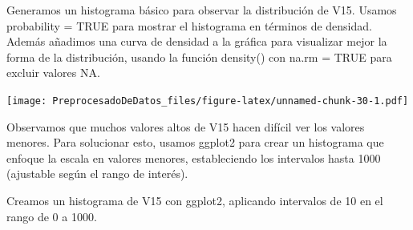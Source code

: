 \documentclass[
]{article}
\newenvironment{Shaded}{\begin{snugshade}}{\end{snugshade}}
\newcommand{\AttributeTok}[1]{\textcolor[rgb]{0.13,0.29,0.53}{#1}}
\newcommand{\ConstantTok}[1]{\textcolor[rgb]{0.56,0.35,0.01}{#1}}
\newcommand{\DecValTok}[1]{\textcolor[rgb]{0.00,0.00,0.81}{#1}}
\newcommand{\FloatTok}[1]{\textcolor[rgb]{0.00,0.00,0.81}{#1}}
\newcommand{\FunctionTok}[1]{\textcolor[rgb]{0.13,0.29,0.53}{\textbf{#1}}}
\newcommand{\NormalTok}[1]{#1}
\newcommand{\OtherTok}[1]{\textcolor[rgb]{0.56,0.35,0.01}{#1}}
\newcommand{\SpecialCharTok}[1]{\textcolor[rgb]{0.81,0.36,0.00}{\textbf{#1}}}
\newcommand{\StringTok}[1]{\textcolor[rgb]{0.31,0.60,0.02}{#1}}
\begin{document}
Generamos un histograma básico para observar la distribución de V15.
Usamos probability = TRUE para mostrar el histograma en términos de
densidad. Además añadimos una curva de densidad a la gráfica para
visualizar mejor la forma de la distribución, usando la función
density() con na.rm = TRUE para excluir valores NA.

\begin{Shaded}
\end{Shaded}

\texttt{[image: PreprocesadoDeDatos\_files/figure-latex/unnamed-chunk-30-1.pdf]}

Observamos que muchos valores altos de V15 hacen difícil ver los valores
menores. Para solucionar esto, usamos ggplot2 para crear un histograma
que enfoque la escala en valores menores, estableciendo los intervalos
hasta 1000 (ajustable según el rango de interés).

Creamos un histograma de V15 con ggplot2, aplicando intervalos de 10 en
el rango de 0 a 1000.

\begin{Shaded}
\end{Shaded}
\end{document}
